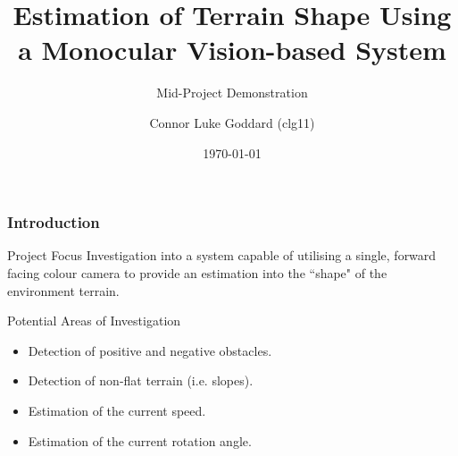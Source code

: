 \documentclass[10pt, compress]{beamer}
\title{Estimation of Terrain Shape Using a Monocular Vision-based System}
\subtitle{Mid-Project Demonstration}
\date{\today}
\author{Connor Luke Goddard (clg11)}
\institute{Aberystwyth University}
\begin{document}
\maketitle

\begin{frame}[fragile]
  \frametitle{Introduction}
  
  \begin{block}{Project Focus}
    Investigation into a system capable of utilising a single, forward facing colour camera to provide an estimation into the ``shape" of the environment terrain. 
  \end{block}
  
  \begin{block}{Potential Areas of Investigation}
    \begin{itemize}
  \item Detection of positive and negative obstacles.
  \item Detection of non-flat terrain (i.e. slopes).
  \item Estimation of the current speed.
  \item Estimation of the current rotation angle.
  \end{itemize}
  \end{block}

\end{frame}

\end{document}
